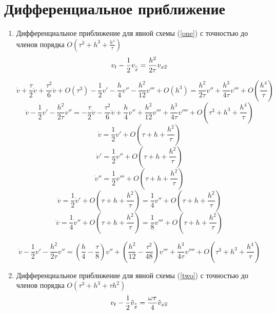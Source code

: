 \section{Дифференциальное приближение}
\begin{enumerate}
\item Дифференциальное приближение для явной схемы  (\ref{one}) с точностью до членов порядка $O\left(\tau^3+ h^3 +\frac{h^4}{\tau}\right) $
\[
v_t - \frac{1}{2} v_{ \overset{\circ}{x} } = \frac{h^2}{2\tau} v_{x \overline{x}}
\]


\[
\dot v + \frac{\tau}{2} \ddot v  + \frac{\tau^2}{6} \dddot v + O\left(\tau^3\right) - \frac{1}{2} v' -  \frac{h}{4}v'' - \frac{h^2}{12} v''' + O\left(h^3\right) = 
\frac{h^2}{2\tau} v'' + \frac{h^3}{4\tau} v''' + O\left(\frac{h^4}{\tau}\right) 
\]
\[
\dot v - \frac{1}{2} v' - \frac{h^2}{2\tau} v'' = - \frac{\tau}{2} \ddot v  - \frac{\tau^2}{6} \dddot v  +  \frac{h}{4}v'' + \frac{h^2}{12} v''' 
 + \frac{h^3}{4\tau} v'''' + O\left(\tau^3+ h^3 +\frac{h^4}{\tau}\right) 
\]
\[
\dot v = \frac{1}{2} v' + O\left(\tau + h + \frac{h^2}{\tau}\right)
\]
\[
\dot v' = \frac{1}{2} v'' + O\left(\tau + h + \frac{h^2}{\tau}\right)
\]
\[
\dot v'' = \frac{1}{2} v''' + O\left(\tau + h + \frac{h^2}{\tau}\right)
\]
\[
\ddot v = \frac{1}{2} \dot v' + O\left(\tau + h + \frac{h^2}{\tau}\right) = \frac{1}{4} v'' +  O\left(\tau + h + \frac{h^2}{\tau}\right) 
\]
\[
\dddot v = \frac{1}{4} \dot v'' + O\left(\tau + h + \frac{h^2}{\tau}\right) = \frac{1}{8} v''' +  O\left(\tau + h + \frac{h^2}{\tau}\right) 
\]


\[
\dot v - \frac{1}{2} v' - \frac{h^2}{2\tau} v'' = \left(\frac{h}{4} - \frac{\tau}{8} \right) v''  + \left(\frac{h^2}{12}  - \frac{\tau^2}{48} \right)  v'''   + \frac{h^3}{4\tau} v'''' + O\left(\tau^3+ h^3 +\frac{h^4}{\tau}\right) 
\]

\item Дифференциальное приближение для явной схемы  (\ref{two}) с точностью до членов порядка $O\left(\tau^3 +h^3 + \tau h^2\right)$
\[
v_t - \frac{1}{2}\hat{v}_{ \overset{\circ}{x} } = \frac{\omega \tau}{4} \hat{v}_{x \overline{x}}
\]



\end{enumerate}
